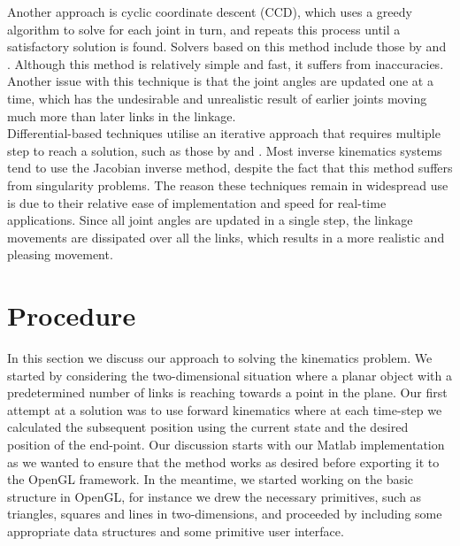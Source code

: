 \documentclass[paper=a4, fontsize=11pt]{scrartcl} %
\numberwithin{equation}{section} %
\numberwithin{figure}{section} %
\numberwithin{table}{section} %
\begin{document}
Another approach is cyclic coordinate descent (CCD), which uses a greedy algorithm to solve for each joint in turn, and repeats this process until a satisfactory solution is found. Solvers based on this method include those by \cite{Eber01} and \cite{Wang91}. Although this method is relatively simple and fast, it suffers from inaccuracies. Another issue with this technique is that the joint angles are updated one at a time, which has the undesirable and unrealistic result of earlier joints moving much more than later links in the linkage. \\

Differential-based techniques utilise an iterative approach that requires multiple step to reach a solution, such as those by \cite{Watt92} and \cite{Zhao94}. Most inverse kinematics systems tend to use the Jacobian inverse method, despite the fact that this method suffers from singularity problems. The reason these techniques remain in widespread use is due to their relative ease of implementation and speed for real-time applications. Since all joint angles are updated in a single step, the linkage movements are dissipated over all the links, which results in a more realistic and pleasing movement. \\




\section{Procedure}
In this section we discuss our approach to solving the kinematics problem. We started by considering the two-dimensional situation where a planar object with a predetermined number of links is reaching towards a point in the plane. Our first attempt at a solution was to use forward kinematics where at each time-step we calculated the subsequent position using the current state and the desired position of the end-point. Our discussion starts with our Matlab implementation as we wanted to ensure that the method works as desired before exporting it to the OpenGL framework. In the meantime, we started working on the basic structure in OpenGL, for instance we drew the necessary primitives, such as triangles, squares and lines in two-dimensions, and proceeded by including some appropriate data structures and some primitive user interface. \\
\end{document}
